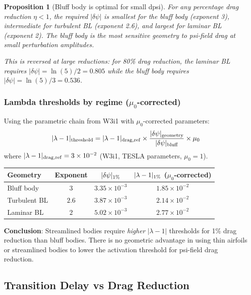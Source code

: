 \documentclass[11pt,twocolumn]{article}
\newcommand{\dpsi}{\delta\psi}
\newcommand{\lam}{\lambda}
\newtheorem{proposition}{Proposition}
\begin{document}
\begin{proposition}[Bluff body is optimal for small dpsi]
\label{prop:bluff_optimal}
For any percentage drag reduction $\eta < 1$, the required $|\dpsi|$ is
smallest for the bluff body (exponent 3), intermediate for turbulent BL
(exponent 2.6), and largest for laminar BL (exponent 2). The bluff body is
the most sensitive geometry to psi-field drag at small perturbation amplitudes.

This is reversed at large reductions: for 80\% drag reduction,
the laminar BL requires $|\dpsi| = \ln(5)/2 = 0.805$ while the bluff body
requires $|\dpsi| = \ln(5)/3 = 0.536$.
\end{proposition}

\subsubsection{Lambda thresholds by regime ($\mu_0$-corrected)}

Using the parametric chain from W3i1 with $\mu_0$-corrected parameters:
\begin{equation}
|\lam-1|_{\rm threshold} = |\lam-1|_{\rm drag,ref}\times
\frac{|\dpsi|_{\rm geometry}}{|\dpsi|_{\rm bluff}}\times \mu_0
\end{equation}
where $|\lam-1|_{\rm drag,ref} = 3\times10^{-2}$ (W3i1, TESLA parameters,
$\mu_0=1$).

\begin{center}
\begin{tabular}{@{}lccc@{}}
\toprule
\textbf{Geometry} & \textbf{Exponent} & $|\dpsi|_{\rm 1\%}$
  & $|\lam-1|_{\rm 1\%}$ ($\mu_0$-corrected) \\
\midrule
Bluff body & $3$ & $3.35\times10^{-3}$ & $1.85\times10^{-2}$ \\
Turbulent BL & $2.6$ & $3.87\times10^{-3}$ & $2.14\times10^{-2}$ \\
Laminar BL & $2$ & $5.02\times10^{-3}$ & $2.77\times10^{-2}$ \\
\bottomrule
\end{tabular}
\end{center}

\textbf{Conclusion}: Streamlined bodies require \emph{higher} $|\lam-1|$
thresholds for 1\% drag reduction than bluff bodies. There is no geometric
advantage in using thin airfoils or streamlined bodies to lower the activation
threshold for psi-field drag reduction.

\subsection{Transition Delay vs Drag Reduction}
\end{document}
